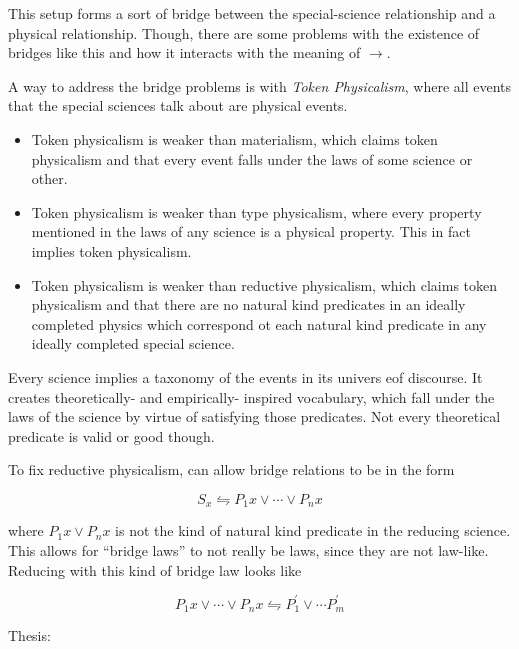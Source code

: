 \documentclass{article}
\newcommand{\ti}[1]{\textit{#1}}
\newcommand{\p}{^\prime}
\begin{document}
This setup forms a sort of bridge between the special-science relationship and a physical relationship. Though, there are some problems with the existence of bridges like this and how it interacts with the meaning of $\rightarrow$.

A way to address the bridge problems is with \ti{Token Physicalism}, where all events that the special sciences talk about are physical events.
\begin{itemize}
    \item Token physicalism is weaker than materialism, which claims token physicalism and that every event falls under the laws of some science or other.
    \item Token physicalism is weaker than type physicalism, where every property mentioned in the laws of any science is a physical property. This in fact implies token physicalism.
    \item Token physicalism is weaker than reductive physicalism, which claims token physicalism and that there are no natural kind predicates in an ideally completed physics which correspond ot each natural kind predicate in any ideally completed special science.
\end{itemize}

Every science implies a taxonomy of the events in its univers eof discourse. It creates theoretically- and empirically- inspired vocabulary, which fall under the laws of the science by virtue of satisfying those predicates. Not every theoretical predicate is valid or good though.

To fix reductive physicalism, can allow bridge relations to be in the form

$$
    S_x \leftrightharpoons P_1 x \lor \cdots \lor P_n x
$$

where $P_1 x \lor P_n x$ is not the kind of natural kind predicate in the reducing science. This allows for ``bridge laws'' to not really be laws, since they are not law-like. Reducing with this kind of bridge law looks like

$$
    P_1 x \lor \cdots \lor P_n x \leftrightharpoons P\p_1 \lor \cdots P\p_m
$$

Thesis:
\end{document}
